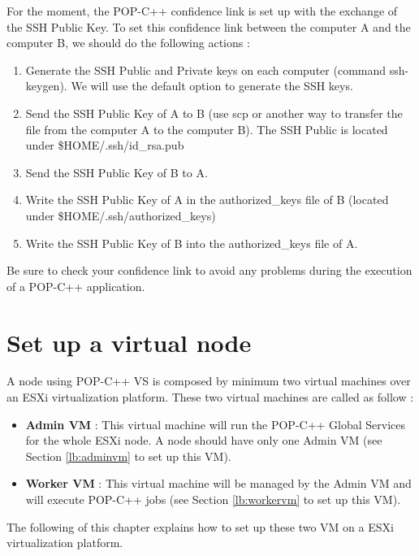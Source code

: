 \documentclass[a4paper, 11pt]{article}
\begin{document}
For the moment, the POP-C++ confidence link is set up with the exchange of the SSH Public Key. To set this confidence link between the computer A and the computer B, we should do the following actions : 

\begin{enumerate}
\item Generate the SSH Public and Private keys on each computer (command ssh-keygen). We will use the default option to generate the SSH keys. 
\item Send the SSH Public Key of A to B (use scp or another way to transfer the file from the computer A to the computer B). The SSH Public is located under \$HOME/.ssh/id\_rsa.pub
\item Send the SSH Public Key of B to A.
\item Write the SSH Public Key of A in the authorized\_keys file of B (located under \$HOME/.ssh/authorized\_keys)
\item Write the SSH Public Key of B into the authorized\_keys file of A. 
\end{enumerate}

Be sure to check your confidence link to avoid any problems during the execution of a POP-C++ application. 

\section{Set up a virtual node}
A node using POP-C++ VS is composed by minimum two virtual machines over an ESXi virtualization platform. These two virtual machines are called as follow : 

\begin{itemize}
\item \textbf{Admin VM} : This virtual machine will run the POP-C++ Global Services for the whole ESXi node. A node should have only one Admin VM (see Section \ref{lb:adminvm} to set up this VM).
\item \textbf{Worker VM} : This virtual machine will be managed by the Admin VM and will execute POP-C++ jobs (see Section \ref{lb:workervm} to set up this VM). 
\end{itemize}

The following of this chapter explains how to set up these two VM on a ESXi virtualization platform.





\end{document}
